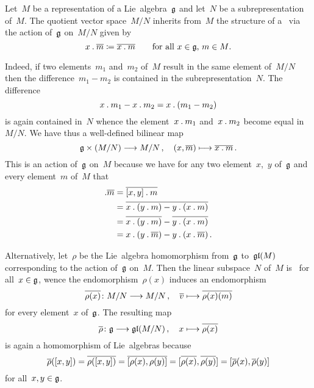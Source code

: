 \begin{example}
  \label{quotient representation}
  Let~$M$ be a representation of a Lie~algebra~$\glie$ and let~$N$ be a subrepresentation of~$M$.
  The quotient vector space~$M/N$ inherits from~$M$ the structure of a~{\representation{$\glie$}} via the action of~$\glie$ on~$M/N$ given by
  \[
    x \mathbin{.} \overline{m}
    \coloneqq
    \overline{x \mathbin{.} m}
    \qquad
    \text{for all~$x \in \mathfrak{g}$,~$m \in M$}.
  \]

  Indeed, if two elements~$m_1$ and~$m_2$ of~$M$ result in the same element of~$M/N$ then the difference~$m_1 - m_2$ is contained in the subrepresentation~$N$.
  The difference
  \[
    x \mathbin{.} m_1 - x \mathbin{.} m_2
    =
    x \mathbin{.} (m_1 - m_2)
  \]
  is again contained in~$N$ whence the element~$x \mathbin{.} m_1$ and~$x \mathbin{.} m_2$ become equal in~$M/N$.
  We have thus a well-defined bilinear map
  \[
    \glie \times (M / N)
    \to
    M / N \,,
    \quad
    (x, \class{m})
    \mapsto
    \class{x \act m} \,.
  \]
  This is an action of~$\glie$ on~$M$ because we have for any two element~$x$,~$y$ of~$\glie$ and every element~$m$ of~$M$ that
  \begin{align*}
    [x,y] \act \class{m}
    &=
    \class{[x,y] \act m}
    \\
    &=
    \class{x \act (y \act m) - y \act (x \act m)}
    \\
    &=
    \class{x \act (y \act m)} - \class{y \act (x \act m)}
    \\
    &=
    x \act (y \act \class{m}) - y \act (x \act \class{m}) \,.
  \end{align*}
  
  Alternatively, let~$\rho$ be the Lie~algebra homomorphism from~$\glie$ to~$\mathfrak{gl}(M)$ corresponding to the action of~$\glie$ on~$M$.
  Then the linear subspace~$N$ of~$M$ is~{} for all~$x \in \mathfrak{g}$, wence the endomorphism~$\rho(x)$ induces an endomorphism
  \[
    \induced{\rho(x)}
    \colon
    M/N
    \to
    M/N \,,
    \quad
    \class{v}
    \mapsto
    \class{\rho(x)(m)}
  \]
  for every element~$x$ of~$\glie$.
  The resulting map
  \[
    \induced{\rho}
    \colon
    \glie
    \to
    \gllie(M/N) \,,
    \quad
    x
    \mapsto
    \induced{\rho(x)}
  \]
  is again a homomorphism of Lie~algebras because
  \[
    \overline{\rho}([x,y])
    =
    \overline{\rho([x,y])}
    =
    \overline{[\rho(x), \rho(y)]}
    =
    [\overline{\rho(x)}, \overline{\rho(y)}]
    =
    [\overline{\rho}(x), \overline{\rho}(y)]
  \]
  for all~$x, y \in \mathfrak{g}$.
\end{example}



